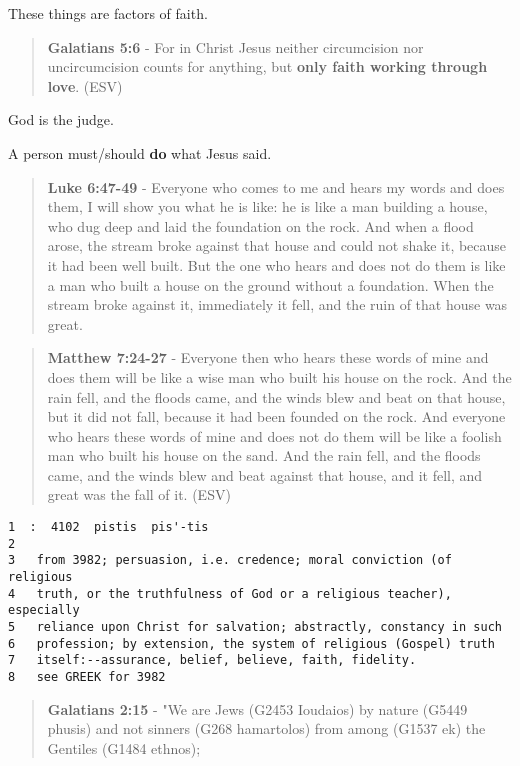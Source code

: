 \documentclass[11pt]{article}
\begin{document}
These things are factors of faith.

\begin{quote}
\textbf{Galatians 5:6} - For in Christ Jesus neither circumcision nor uncircumcision counts for anything, but \textbf{only faith working through love}. (ESV)
\end{quote}

God is the judge.

A person must/should \textbf{do} what Jesus said.

\begin{quote}
\textbf{Luke 6:47-49} - Everyone who comes to me and hears my words and does them, I will show you what he is like: he is like a man building a house, who dug deep and laid the foundation on the rock. And when a flood arose, the stream broke against that house and could not shake it, because it had been well built.  But the one who hears and does not do them is like a man who built a house on the ground without a foundation. When the stream broke against it, immediately it fell, and the ruin of that house was great.
\end{quote}

\begin{quote}
\textbf{Matthew 7:24-27} - Everyone then who hears these words of mine and does them will be like a wise man who built his house on the rock. And the rain fell, and the floods came, and the winds blew and beat on that house, but it did not fall, because it had been founded on the rock. And everyone who hears these words of mine and does not do them will be like a foolish man who built his house on the sand. And the rain fell, and the floods came, and the winds blew and beat against that house, and it fell, and great was the fall of it. (ESV)
\end{quote}

\begin{verbatim}
1  :  4102  pistis  pis'-tis
2  
3   from 3982; persuasion, i.e. credence; moral conviction (of religious
4   truth, or the truthfulness of God or a religious teacher), especially
5   reliance upon Christ for salvation; abstractly, constancy in such
6   profession; by extension, the system of religious (Gospel) truth
7   itself:--assurance, belief, believe, faith, fidelity.
8   see GREEK for 3982
\end{verbatim}

\begin{quote}
\textbf{Galatians 2:15} - "We are Jews (G2453 Ioudaios) by nature (G5449 phusis) and not sinners (G268 hamartolos) from among (G1537 ek) the Gentiles (G1484 ethnos);
\end{quote}
\end{document}
